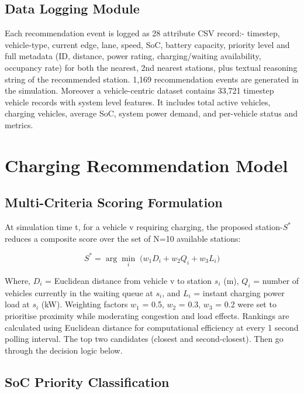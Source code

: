 \documentclass[conference]{IEEEtran}
\begin{document}
\subsection{Data Logging Module}

Each recommendation event is logged as 28 attribute CSV record:-
timestep, vehicle-type, current edge, lane, speed, SoC, battery
capacity, priority level and full metadata (ID, distance, power rating,
charging/waiting availability, occupancy rate) for both the nearest,
2nd nearest stations, plus textual reasoning string of the recommended
station. 1,169 recommendation events are generated in the simulation.
Moreover a vehicle-centric dataset contains 33,721 timestep vehicle
records with system level features. It includes total active vehicles,
charging vehicles, average SoC, system power demand, and per-vehicle
status and metrics.

\section{Charging Recommendation Model}

\subsection{Multi-Criteria Scoring Formulation}

At simulation time t, for a vehicle v requiring charging, the proposed
station-$S^{*}$ reduces a composite score over the set of N=10
available stations:

\begin{equation}
  S^{*} = \arg\min_{i}\;\bigl(w_1 D_i + w_2 Q_i + w_3 L_i\bigr)
  \label{eq:score}
\end{equation}

Where, $D_i$ = Euclidean distance from vehicle v to station $s_i$ (m),
$Q_i$ = number of vehicles currently in the waiting queue at $s_i$, and
$L_i$ = instant charging power load at $s_i$ (kW). Weighting factors
$w_1$ = 0.5, $w_2$ = 0.3, $w_3$ = 0.2 were set to prioritise proximity
while moderating congestion and load effects. Rankings are calculated
using Euclidean distance for computational efficiency at every 1 second
polling interval. The top two candidates (closest and second-closest).
Then go through the decision logic below.

\subsection{SoC Priority Classification}
\end{document}
